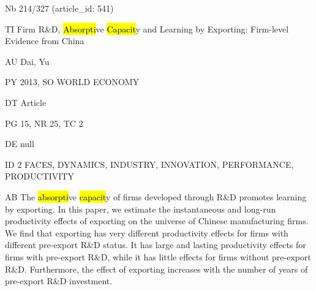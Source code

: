 \documentclass[a4paper]{article}
\begin{document}
\vspace*{-2cm}
Nb \tabto{0cm}214/327 (article\_id: 541)\par
TI \tabto{0cm}Firm R\&D, \hl{Absorpti}ve \hl{Capacit}y and Learning by Exporting: Firm-level Evidence from China\par
AU \tabto{0cm}Dai, Yu\par
PY \tabto{0cm}2013, SO WORLD ECONOMY\par
DT \tabto{0cm}Article\par
PG \tabto{0cm}15, NR 25, TC 2\par
DE \tabto{0cm}null\par
ID \tabto{0cm}2 FACES, DYNAMICS, INDUSTRY, INNOVATION, PERFORMANCE, PRODUCTIVITY\par
AB \tabto{0cm}The \hl{absorpti}ve \hl{capacit}y of firms developed through R\&D promotes learning by exporting. In this paper, we estimate the instantaneous and long-run productivity effects of exporting on the universe of Chinese manufacturing firms. We find that exporting has very different productivity effects for firms with different pre-export R\&D status. It has large and lasting productivity effects for firms with pre-export R\&D, while it has little effects for firms without pre-export R\&D. Furthermore, the effect of exporting increases with the number of years of pre-export R\&D investment.\par
\clearpage
\end{document}
